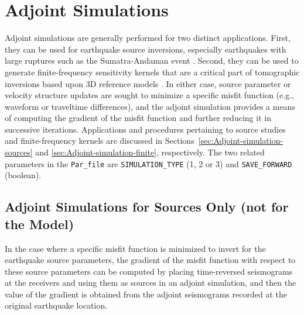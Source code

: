 \documentclass[oneside,english]{book}
\begin{document}
\chapter{\label{cha:Adjoint-Simulations}Adjoint Simulations}

Adjoint simulations are generally performed for two distinct applications.
First, they can be used for earthquake source inversions, especially
earthquakes with large ruptures such as the Sumatra-Andaman event
\citep{LayKanamoriAmmon2005,AmmonJiThio2005,ParkSongTromp2005}. Second,
they can be used to generate finite-frequency sensitivity kernels
that are a critical part of tomographic inversions based upon 3D reference
models \citep{TrTaLi05,LiTr06,TrKoLi08,LiTr08}. In either case, source
parameter or velocity structure updates are sought to minimize a specific
misfit function (e.g., waveform or traveltime differences), and the
adjoint simulation provides a means of computing the gradient of the
misfit function and further reducing it in successive iterations.
Applications and procedures pertaining to source studies and finite-frequency
kernels are discussed in Sections~\ref{sec:Adjoint-simulation-sources}
and \ref{sec:Adjoint-simulation-finite}, respectively. The two related
parameters in the \texttt{Par\_file} are \texttt{SIMULATION\_TYPE}
(1, 2 or 3) and \texttt{SAVE\_FORWARD} (boolean).


\section{\label{sec:Adjoint-simulation-sources}Adjoint Simulations for Sources Only (not for the Model)}

In the case where a specific misfit function is minimized to invert
for the earthquake source parameters, the gradient of the misfit function
with respect to these source parameters can be computed by placing
time-reversed seismograms at the receivers and using them as sources
in an adjoint simulation, and then the value of the gradient is obtained
from the adjoint seismograms recorded at the original earthquake location.
\end{document}
